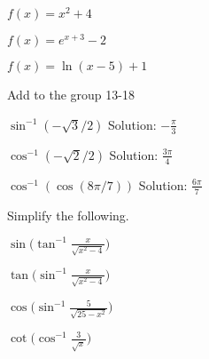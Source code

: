 \nofiles\documentclass[11pt]{report}
\newcommand{\ds}{\displaystyle}
\begin{document}
$f(x)=x^2 +4$

$f(x)=e^{x+3}-2$

$f(x)=\ln(x-5)+1$

Add to the group 13-18

$\sin^{-1}(-\sqrt3 /2)$   Solution: $-\frac{\pi}{3}$

$\cos^{-1}(-\sqrt2/2)$  Solution: $\frac{3\pi}{4}$

$\cos^{-1}(\cos(8\pi/7))$  Solution: $\frac{6\pi}{7}$

Simplify the following. %

$\ds \sin \biggl(\tan^{-1} \frac{x}{\sqrt{x^2-4}}\biggr)$

$\ds \tan \biggl(\sin^{-1} \frac{x}{\sqrt{x^2-4}}\biggr)$

$\ds \cos \biggl(\sin^{-1} \frac{5}{\sqrt{25-x^2}}\biggr)$

$\ds \cot \biggl(\cos^{-1} \frac{3}{\sqrt{x}}\biggr)$
\end{document}

